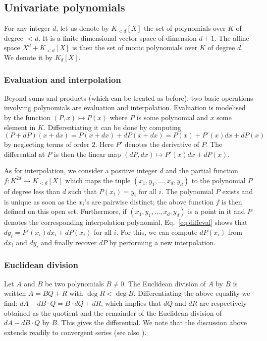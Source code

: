 \documentclass{lms}
\begin{document}
\subsection{Univariate polynomials}
\label{ssec:polynomials}

For any integer $d$, let us denote by $K_{< d}[X]$ the set of 
polynomials over $K$ of degree $< d$. It is a finite dimensional vector 
space of dimension $d+1$. The affine space $X^d + K_{< d}[X]$ is then 
the set of monic polynomials over $K$ of degree $d$. We denote it by 
$K_d[X]$.

\subsubsection*{Evaluation and interpolation}

Beyond sums and products (which can be treated as before), two basic 
operations involving polynomials are evaluation and interpolation.
Evaluation is modelised by the function $(P,x) \mapsto P(x)$ where
$P$ is some polynomial and $x$ some element in $K$. Differentiating
it can be done by computing
\begin{equation}
\label{eq:diffeval}
(P + dP)(x + dx) = P(x + dx) + dP(x + dx) = P(x) + P'(x) dx + dP(x)
\end{equation}
by neglecting terms of order $2$. Here $P'$ denotes the derivative of 
$P$. The differential at $P$ is then the linear map $(dP, dx) \mapsto 
P'(x) dx + dP(x)$.

As for interpolation, we consider a positive integer $d$ and the partial 
function $f : K^{2d} \to K_{< d}[X]$ which maps the tuple $(x_1, y_1, 
\ldots, x_d, y_d)$ to the polynomial $P$ of degree less than $d$ such 
that $P(x_i) = y_i$ for all $i$. The polynomial $P$ exists and is unique 
as soon as the $x_i$'s are pairwise distinct; the above function $f$ is 
then defined on this open set. Furthermore, if $(x_1, y_1, \ldots, x_d, 
y_d)$ is a point in it and $P$ denotes the corresponding interpolation 
polynomial, Eq.~\eqref{eq:diffeval} shows that $d y_i = P'(x_i) dx_i + 
dP(x_i)$ for all $i$. For this, we can compute $dP(x_i)$ from $d x_i$ 
and $d y_i$ and finally recover $dP$ by performing a new interpolation.

\subsubsection*{Euclidean division}

Let $A$ and $B$ be two polynomials $B \neq 0$. The Euclidean division of 
$A$ by $B$ is written $A = BQ + R$ with $\deg R < \deg B$. 
Differentiating the above equality we find:
$dA - dB \cdot Q = B \cdot dQ + dR$,
which implies that $dQ$ and $dR$ are respectively obtained as the 
quotient and the remainder of the Euclidean division of $dA - dB \cdot 
Q$ by $B$. This gives the differential. We note that the discussion 
above extends readily to convergent series (see also 
\cite{caruso-lubicz:14a}).
\end{document}
